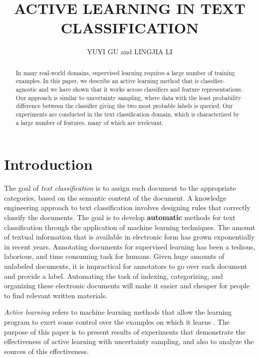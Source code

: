 \documentclass{acmtog}
\begin{document}
\title{ACTIVE LEARNING IN TEXT CLASSIFICATION} %
\author{YUYI GU {\upshape and} LINGJIA LI
}

\maketitle

\begin{abstract}
In many real-world domains, supervised learning requires a large number of training examples. In this paper, we describe an active learning method that is classifier-agnostic and we have shown that it works across classifiers and feature representations. Our approach is similar to uncertainty sampling, where data with the least probability difference between the classifier giving the two most probable labels is queried. Our experiments are conducted in the text classification domain, which is characterized by a large number of features, many of which are irrelevant.
 
\end{abstract}

\section{Introduction}
The goal of\textit{ text classification }is to assign each document to the appropriate categories, based on the semantic content of the document. A knowledge engineering approach to text classification involves designing rules that correctly classify the documents. The goal is to develop \textbf{automatic} methods for text classification through the application of machine learning techniques.
The amount of textual information that is available in electronic form has grown exponentially in recent years. Annotating documents for supervised learning has been a tedious, laborious, and time consuming task for humans. Given huge amounts of unlabeled documents, it is impractical for annotators to go over each document and provide a label. Automating the task of indexing, categorizing, and organizing these electronic documents will make it easier and cheaper for people to find relevant written materials.

\textit{Active learning} refers to machine learning methods that allow the learning program to exert some control over the examples on which it learns \cite{cohn1994improving}. The purpose of this paper is to present results of experiments that demonstrate the effectiveness of active learning with uncertainty sampling, and also to analyze the sources of this effectiveness. 
\end{document}
